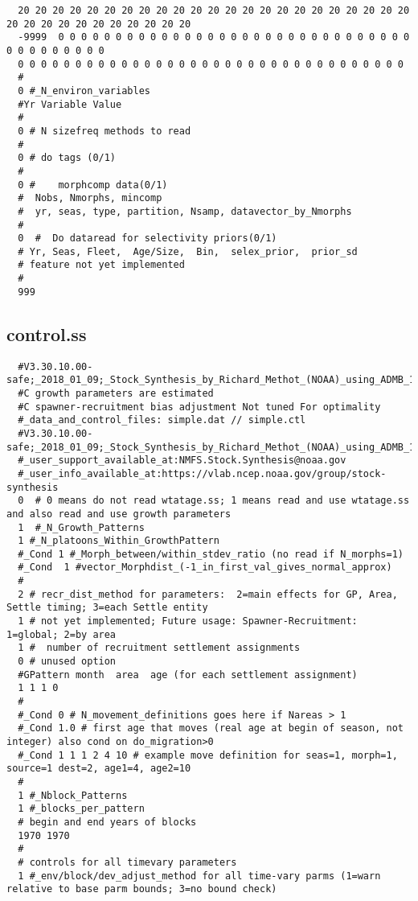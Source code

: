 \begin{landscape}
{\begin{verbatim}
  20 20 20 20 20 20 20 20 20 20 20 20 20 20 20 20 20 20 20 20 20 20 20 20 20 20 20 20 20 20 20 20 20 20
  -9999  0 0 0 0 0 0 0 0 0 0 0 0 0 0 0 0 0 0 0 0 0 0 0 0 0 0 0 0 0 0 0 0 0 0 0 0 0 0 0 0
  0 0 0 0 0 0 0 0 0 0 0 0 0 0 0 0 0 0 0 0 0 0 0 0 0 0 0 0 0 0 0 0 0 0
  #
  0 #_N_environ_variables
  #Yr Variable Value
  #
  0 # N sizefreq methods to read 
  #
  0 # do tags (0/1)
  #
  0 #    morphcomp data(0/1) 
  #  Nobs, Nmorphs, mincomp
  #  yr, seas, type, partition, Nsamp, datavector_by_Nmorphs
  #
  0  #  Do dataread for selectivity priors(0/1)
  # Yr, Seas, Fleet,  Age/Size,  Bin,  selex_prior,  prior_sd
  # feature not yet implemented
  #
  999
\end{verbatim}
}


\subsection{control.ss}
\scriptsize{
\begin{verbatim}
  #V3.30.10.00-safe;_2018_01_09;_Stock_Synthesis_by_Richard_Methot_(NOAA)_using_ADMB_11.6
  #C growth parameters are estimated
  #C spawner-recruitment bias adjustment Not tuned For optimality
  #_data_and_control_files: simple.dat // simple.ctl
  #V3.30.10.00-safe;_2018_01_09;_Stock_Synthesis_by_Richard_Methot_(NOAA)_using_ADMB_11.6
  #_user_support_available_at:NMFS.Stock.Synthesis@noaa.gov
  #_user_info_available_at:https://vlab.ncep.noaa.gov/group/stock-synthesis
  0  # 0 means do not read wtatage.ss; 1 means read and use wtatage.ss and also read and use growth parameters
  1  #_N_Growth_Patterns
  1 #_N_platoons_Within_GrowthPattern 
  #_Cond 1 #_Morph_between/within_stdev_ratio (no read if N_morphs=1)
  #_Cond  1 #vector_Morphdist_(-1_in_first_val_gives_normal_approx)
  #
  2 # recr_dist_method for parameters:  2=main effects for GP, Area, Settle timing; 3=each Settle entity
  1 # not yet implemented; Future usage: Spawner-Recruitment: 1=global; 2=by area
  1 #  number of recruitment settlement assignments 
  0 # unused option
  #GPattern month  area  age (for each settlement assignment)
  1 1 1 0
  #
  #_Cond 0 # N_movement_definitions goes here if Nareas > 1
  #_Cond 1.0 # first age that moves (real age at begin of season, not integer) also cond on do_migration>0
  #_Cond 1 1 1 2 4 10 # example move definition for seas=1, morph=1, source=1 dest=2, age1=4, age2=10
  #
  1 #_Nblock_Patterns
  1 #_blocks_per_pattern 
  # begin and end years of blocks
  1970 1970
  #
  # controls for all timevary parameters 
  1 #_env/block/dev_adjust_method for all time-vary parms (1=warn relative to base parm bounds; 3=no bound check)

\end{verbatim}}
\end{landscape}
